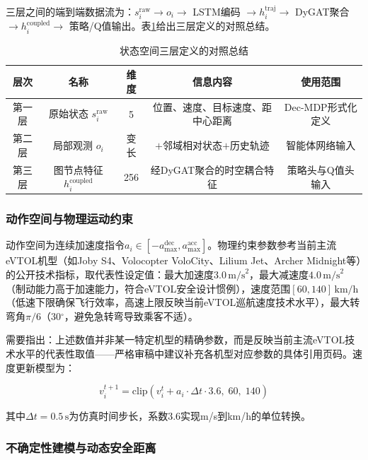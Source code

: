 \documentclass[12pt,a4paper,UTF8]{ctexart}
\begin{document}
三层之间的端到端数据流为：$s_i^{\text{raw}} \to o_i \to$ LSTM编码 $\to h_i^{\text{traj}} \to$ DyGAT聚合 $\to h_i^{\text{coupled}} \to$ 策略/Q值输出。表\ref{tab:state_layers}给出三层定义的对照总结。

\begin{table}[H]
    \centering
    \caption{状态空间三层定义的对照总结}
    \label{tab:state_layers}
    \begin{tabular}{|c|c|c|c|c|}
        \hline
        \textbf{层次} & \textbf{名称} & \textbf{维度} & \textbf{信息内容} & \textbf{使用范围} \\
        \hline
        第一层 & 原始状态 $s_i^{\text{raw}}$ & 5 & 位置、速度、目标速度、距中心距离 & Dec-MDP形式化定义 \\
        \hline
        第二层 & 局部观测 $o_i$ & 变长 & $+$邻域相对状态$+$历史轨迹 & 智能体网络输入 \\
        \hline
        第三层 & 图节点特征 $h_i^{\text{coupled}}$ & 256 & 经DyGAT聚合的时空耦合特征 & 策略头与Q值头输入 \\
        \hline
    \end{tabular}
\end{table}

\subsubsection{动作空间与物理运动约束}

动作空间为连续加速度指令$a_i \in [-a_{\max}^{\text{dec}}, a_{\max}^{\text{acc}}]$。物理约束参数参考当前主流eVTOL机型（如Joby S4、Volocopter VoloCity、Lilium Jet、Archer Midnight等）的公开技术指标\cite{ref28,ref29,ref30}，取代表性设定值：最大加速度$3.0\,\text{m/s}^2$，最大减速度$4.0\,\text{m/s}^2$（制动能力高于加速能力，符合eVTOL安全设计惯例），速度范围$[60, 140]\,\text{km/h}$（低速下限确保飞行效率，高速上限反映当前eVTOL巡航速度技术水平），最大转弯角$\pi/6$（30$^\circ$，避免急转弯导致乘客不适）。

需要指出：上述数值并非某一特定机型的精确参数，而是反映当前主流eVTOL技术水平的代表性取值——严格审稿中建议补充各机型对应参数的具体引用页码。速度更新模型为：

\begin{equation}
    v_i^{t+1} = \text{clip}\left(v_i^{t} + a_i \cdot \Delta t \cdot 3.6,\; 60,\; 140\right)
\end{equation}

其中$\Delta t = 0.5\,\text{s}$为仿真时间步长，系数3.6实现m/s到km/h的单位转换。

\subsubsection{不确定性建模与动态安全距离}
\end{document}

